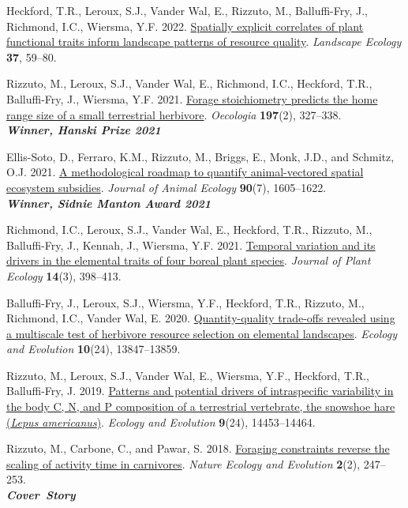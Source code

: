 \begin{etaremune}
  \item Heckford, T.R., Leroux, S.J., Vander Wal, E., \textcolor{awesome}{Rizzuto, M.}, Balluffi-Fry, J., Richmond, I.C., Wiersma, Y.F. 2022. \href{https://doi.org/10.1007/s10980-021-01334-3}{Spatially explicit correlates of plant functional traits inform landscape patterns of resource quality}. \emph{Landscape Ecology} \textbf{37}, 59--80.
  \item \textcolor{awesome}{Rizzuto, M.}, Leroux, S.J., Vander Wal, E., Richmond, I.C., Heckford, T.R., Balluffi-Fry, J., Wiersma, Y.F. 2021. \href{https://rdcu.be/cSX31}{Forage stoichiometry predicts the home range size of a small terrestrial herbivore}. \emph{Oecologia} \textbf{197}(2), 327--338.\\ \null\hfill\textbf{\textit{Winner, Hanski Prize 2021}}
  \item Ellis-Soto, D.\textsuperscript{\textdagger}, Ferraro, K.M.\textsuperscript{\textdagger}, \textcolor{awesome}{Rizzuto, M.}, Briggs, E., Monk, J.D., and Schmitz, O.J. 2021. \href{https://doi.org/10.1111/1365-2656.13538}{A methodological roadmap to quantify animal-vectored spatial ecosystem subsidies}. \emph{Journal of Animal Ecology} \textbf{90}(7), 1605--1622.\\ \null\hfill\textbf{\textit{Winner, Sidnie Manton Award 2021}}
  \item Richmond, I.C., Leroux, S.J., Vander Wal, E., Heckford, T.R., \textcolor{awesome}{Rizzuto, M.}, Balluffi-Fry, J., Kennah, J., Wiersma, Y.F. 2021. \href{https://doi.org/10.1093/jpe/rtaa103}{Temporal variation and its drivers in the elemental traits of four boreal plant species}. \emph{Journal of Plant Ecology} \textbf{14}(3), 398--413.
  \item Balluffi-Fry, J., Leroux, S.J., Wiersma, Y.F., Heckford, T.R., \textcolor{awesome}{Rizzuto, M.}, Richmond, I.C., Vander Wal, E. 2020. \href{https://doi.org/10.1002/ece3.6975}{Quantity-quality trade-offs revealed using a multiscale test of herbivore resource selection on elemental landscapes}. \emph{Ecology and Evolution} \textbf{10}(24), 13847--13859.
  \item \textcolor{awesome}{Rizzuto, M.}, Leroux, S.J., Vander Wal, E., Wiersma, Y.F., Heckford, T.R., Balluffi-Fry, J. 2019. \href{https://doi.org/10.1002/ece3.5880}{Patterns and potential drivers of intraspecific variability in the body C, N, and P composition of a terrestrial vertebrate, the snowshoe hare (\textit{Lepus americanus})}. \textit{Ecology and Evolution} \textbf{9}(24), 14453--14464.
  \item \textcolor{awesome}{Rizzuto, M.}, Carbone, C., and Pawar, S. 2018. \href{https://doi.org/10.1038/s41559-017-0386-1}{Foraging constraints reverse the scaling of activity time in carnivores}. \emph{Nature Ecology and Evolution} \textbf{2}(2), 247--253.\\ \null\hfill\textbf{\textit{Cover~Story}}
\end{etaremune}


